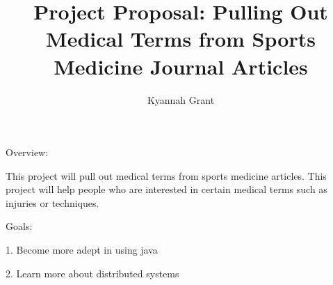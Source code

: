 \documentclass[12pt,letterpaper,notitlepage]{report}
\title{Project Proposal: Pulling Out Medical Terms from Sports Medicine Journal Articles }
\author{Kyannah Grant}
\begin{document}
\maketitle

Overview:
 
 This project will pull out medical terms from sports medicine articles. This project will help  people who are interested in certain medical terms such as injuries or techniques. 
 
 
 Goals:
 
 1. Become more adept in using java
 
 2. Learn more about distributed systems
\end{document}
